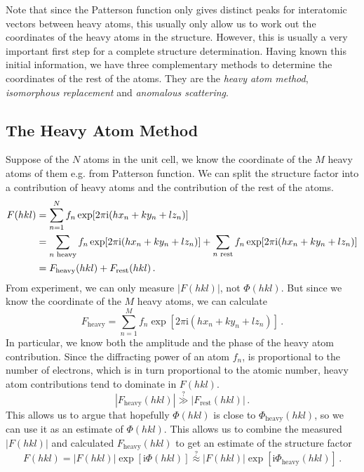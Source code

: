 \documentclass{article}
\theoremstyle{plain}\theoremheaderfont{\normalfont\itshape}\theorembodyfont{\rmfamily}\theoremseparator{.}\newtheorem*{rem}{Remark}\newtheorem*{ex}{Example}\newtheorem*{proof}{Proof}\newtheorem*{altp}{Alternative proof}
\theoremstyle{plain}\theoremheaderfont{\normalfont\bfseries}\theorembodyfont{\rmfamily}\theoremseparator{.}\newtheorem{thm}{Theorem}[section]\newtheorem{lem}[thm]{Lemma}\newtheorem{prop}[thm]{Proposition}\newtheorem*{cor}{Corollary}\newtheorem{defn}[thm]{Definition}\newtheorem{clm}[thm]{Claim}\newtheorem{clminproof}{Claim}\newtheorem*{law}{Law}\newtheorem{pos}[thm]{Postulate}
\theoremstyle{break}\theoremheaderfont{\normalfont\itshape}\theorembodyfont{\rmfamily}\theoremseparator{.\medskip}\newtheorem*{proofskip}{Proof}\newtheorem*{exs}{Examples}\newtheorem*{rems}{Remarks}
\theoremstyle{break}\theoremheaderfont{\normalfont\bfseries}\theorembodyfont{\rmfamily}\theoremseparator{.\medskip}\newtheorem{lemskip}[thm]{Lemma}\newtheorem{defnskip}[thm]{Definition}\newtheorem{propskip}[thm]{Proposition}\newtheorem{thmskip}[thm]{Theorem}
\numberwithin{equation}{section}
\newcommand{\ii}{\mathrm{i}}
\newcommand{\abs}[1]{\left| #1 \right|}
\begin{document}
    Note that since the Patterson function only gives distinct peaks for interatomic vectors between heavy atoms, this usually only allow us to work out the coordinates of the heavy atoms in the structure. However, this is usually a very important first step for a complete structure determination. Having known this initial information, we have three complementary methods to determine the coordinates of the rest of the atoms. They are the \textit{heavy atom method}, \textit{isomorphous replacement} and \textit{anomalous scattering}.

    \subsection{The Heavy Atom Method}
    Suppose of the \(N\) atoms in the unit cell, we know the coordinate of the \(M\) heavy atoms of them e.g. from Patterson function. We can split the structure factor into a contribution of heavy atoms and the contribution of the rest of the atoms.
    \begin{align}
        F(hkl)&=\sum_{n=1}^{N}f_n \exp[2\pi \ii(hx_n+ky_n+lz_n)]\notag\\
        &=\sum_{n\text{ heavy}}f_n \exp[2\pi \ii(hx_n+ky_n+lz_n)] + \sum_{n\text{ rest}}f_n \exp[2\pi \ii(hx_n+ky_n+lz_n)]\notag\\
        &=F_{\text{heavy}}(hkl)+F_{\text{rest}}(hkl)\,.
    \end{align}
    From experiment, we can only measure \(\abs{F(hkl)}\), not \(\Phi(hkl)\). But since we know the coordinate of the \(M\) heavy atoms, we can calculate
    \begin{equation}
        F_{\text{heavy}}=\sum_{n=1}^{M}f_n \exp[2\pi \ii(hx_n+ky_n+lz_n)]\,.
    \end{equation}
    In particular, we know both the amplitude and the phase of the heavy atom contribution. Since the diffracting power of an atom \(f_n\), is proportional to the number of electrons, which is in turn proportional to the atomic number, heavy atom contributions tend to dominate in \(F(hkl)\).
    \[\abs{F_{\text{heavy}}(hkl)}\stackrel{?}{\gg}\abs{F_{\text{rest}}(hkl)}\,.\]
    This allows us to argue that hopefully \(\Phi(hkl)\) is close to \(\Phi_{\text{heavy}}(hkl)\), so we can use it as an estimate of \(\Phi(hkl)\). This allows us to combine the measured \(\abs{F(hkl)}\) and calculated \(F_{\text{heavy}}(hkl)\) to get an estimate of the structure factor
    \begin{equation}
        F(hkl)=\abs{F(hkl)}\exp[\ii\Phi(hkl)]\stackrel{?}{\approx}\abs{F(hkl)}\exp[\ii\Phi_{\text{heavy}}(hkl)]\,.
    \end{equation}
\end{document}
